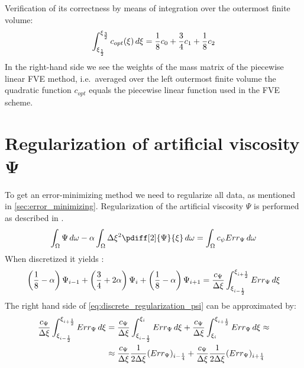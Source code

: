 Verification of its correctness by means of integration over the outermost finite volume:
\begin{align}
\int_{\xi_{\frac{1}{2}}}^{\xi_{\frac{3}{2}}} c_{opt}(\xi)\, d\xi = \frac{1}{8} c_0 + \frac{3}{4} c_1 + \frac{1}{8} c_2
\end{align}
In the right-hand side we see the weights of the mass matrix of the piecewise linear FVE
method, i.e.\ averaged over the left outermost finite volume the quadratic function $c_{opt}$
equals the piecewise linear function used in the FVE scheme.
\section{Regularization of artificial viscosity $\mathbf{\Psi}$}\label{sec:regularization_artificial_viscosity}
To get an error-minimizing method we need to regularize all data, as mentioned in \autoref{sec:error_minimizing}.
Regularization of the artificial viscosity $\Psi$ is performed as described in \citet[eq.\ 14]{Borsboom2001}.
\begin{align}
    \int_\Omega \Psi\, d\omega - \alpha \int_\Omega \Dxi^2 \pdiff[2]{\Psi}{\xi}\, d\omega = \int_\Omega c_{\psi} Err_\Psi\, d\omega
\end{align}
When discretized it yields \citep[eq.\ 18]{Borsboom2001}:
\begin{align}
    \left(\frac{1}{8} - \alpha \right)\Psi_{i-1} + 
    \left(\frac{3}{4} + 2\alpha \right)\Psi_{i} + 
    \left(\frac{1}{8} - \alpha \right)\Psi_{i+1} = \frac{c_{\Psi}}{\Delta \xi} \int^{\xi_{i+\frac{1}{2}}}_{\xi_{i-\frac{1}{2}}} Err_{\Psi}\, d\xi
    \label{eq:discrete_regularization_psi}
\end{align}
%
The right hand side of \autoref{eq:discrete_regularization_psi} can be approximated by:
\begin{align}
    \frac{c_{\Psi}}{\Delta \xi} \int^{\xi_{i+\frac{1}{2}}}_{\xi_{i-\frac{1}{2}}} Err_{\Psi}\, d\xi 
& =
    \frac{c_{\Psi}}{\Delta \xi} \int^{\xi_{i}}_{\xi_{i-\frac{1}{2}}} Err_{\Psi}\, d\xi 
    + \frac{c_{\Psi}}{\Delta \xi} \int^{\xi_{i+\frac{1}{2}}}_{\xi_{i}} Err_{\Psi}\, d\xi \approx 
    \\*
    &\approx \frac{c_{\Psi}}{\Delta \xi} \frac{1}{2\Delta \xi} (Err_{\Psi})_{i-\frac{1}{4}} 
  + \frac{c_{\Psi}}{\Delta \xi} \frac{1}{2\Delta \xi} (Err_{\Psi})_{i+\frac{1}{4}}
\end{align}
